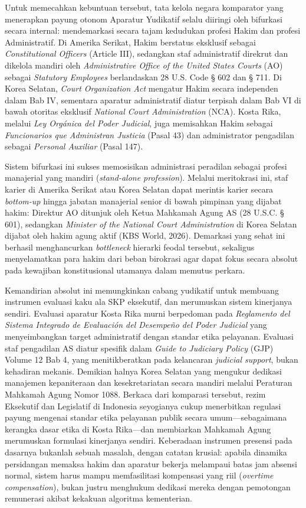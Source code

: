 \documentclass[12pt, a4paper]{article}
\begin{document}
Untuk memecahkan kebuntuan tersebut, tata kelola negara komparator yang menerapkan payung otonom Aparatur Yudikatif selalu diiringi oleh bifurkasi secara internal: mendemarkasi secara tajam kedudukan profesi Hakim dan profesi Administratif. Di Amerika Serikat, Hakim berstatus eksklusif sebagai \textit{Constitutional Officers} (Article III), sedangkan staf administratif direkrut dan dikelola mandiri oleh \textit{Administrative Office of the United States Courts} (AO) sebagai \textit{Statutory Employees} berlandaskan 28 U.S. Code § 602 dan § 711. Di Korea Selatan, \textit{Court Organization Act} mengatur Hakim secara independen dalam Bab IV, sementara aparatur administratif diatur terpisah dalam Bab VI di bawah otoritas eksklusif \textit{National Court Administration} (NCA). Kosta Rika, melalui \textit{Ley Orgánica del Poder Judicial}, juga memisahkan Hakim sebagai \textit{Funcionarios que Administran Justicia} (Pasal 43) dan administrator pengadilan sebagai \textit{Personal Auxiliar} (Pasal 147). 

Sistem bifurkasi ini sukses memosisikan administrasi peradilan sebagai profesi manajerial yang mandiri (\textit{stand-alone profession}). Melalui meritokrasi ini, staf karier di Amerika Serikat atau Korea Selatan dapat merintis karier secara \textit{bottom-up} hingga jabatan manajerial senior di bawah pimpinan yang dijabat hakim: Direktur AO ditunjuk oleh Ketua Mahkamah Agung AS (28 U.S.C. § 601), sedangkan \textit{Minister of the National Court Administration} di Korea Selatan dijabat oleh hakim agung aktif (KBS World, 2026). Demarkasi yang sehat ini berhasil menghancurkan \textit{bottleneck} hierarki feodal tersebut, sekaligus menyelamatkan para hakim dari beban birokrasi agar dapat fokus secara absolut pada kewajiban konstitusional utamanya dalam memutus perkara.

Kemandirian absolut ini memungkinkan cabang yudikatif untuk membuang instrumen evaluasi kaku ala SKP eksekutif, dan merumuskan sistem kinerjanya sendiri. Evaluasi aparatur Kosta Rika murni berpedoman pada \textit{Reglamento del Sistema Integrado de Evaluación del Desempeño del Poder Judicial} yang menyeimbangkan target administratif dengan standar etika pelayanan. Evaluasi staf pengadilan AS diatur spesifik dalam \textit{Guide to Judiciary Policy} (GJP) Volume 12 Bab 4, yang menitikberatkan pada kelancaran \textit{judicial support}, bukan kehadiran mekanis. Demikian halnya Korea Selatan yang mengukur dedikasi manajemen kepaniteraan dan kesekretariatan secara mandiri melalui Peraturan Mahkamah Agung Nomor 1088. Berkaca dari komparasi tersebut, rezim Eksekutif dan Legislatif di Indonesia seyogianya cukup menerbitkan regulasi payung mengenai standar etika pelayanan publik secara umum—sebagaimana kerangka dasar etika di Kosta Rika—dan membiarkan Mahkamah Agung merumuskan formulasi kinerjanya sendiri. Keberadaan instrumen presensi pada dasarnya bukanlah sebuah masalah, dengan catatan krusial: apabila dinamika persidangan memaksa hakim dan aparatur bekerja melampaui batas jam absensi normal, sistem harus mampu memfasilitasi kompensasi yang riil (\textit{overtime compensation}), bukan justru menghukum dedikasi mereka dengan pemotongan remunerasi akibat kekakuan algoritma kementerian.
\end{document}

